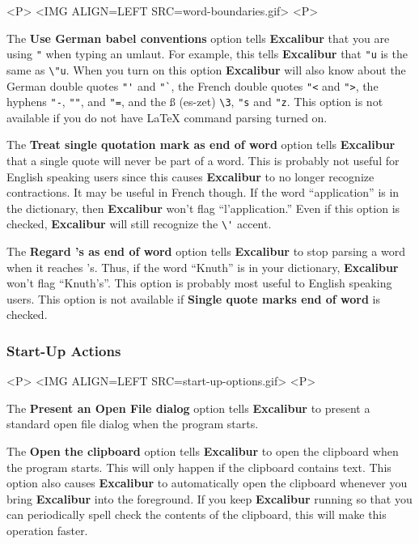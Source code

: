 \documentclass[11pt,titlepage]{article}
\newcommand{\ex}{\textbf{Excalibur}}
\begin{document}
\begin{rawhtml}
<P>
<IMG ALIGN=LEFT SRC=word-boundaries.gif>
<P>
\end{rawhtml}

The \textbf{Use German babel conventions} option tells \ex{} that you
are using \texttt{"} when typing an umlaut.  For example, this tells
\ex{} that \verb+"u+ is the same as \verb+\"u+.  When you turn on this
option \ex{} will also know about the German double quotes \verb+"'+
and \verb+"`+, the French double quotes \verb+"<+ and \verb+">+, the
hyphens \verb+"-+, \verb+""+, and \verb+"=+, and the \ss{} (es-zet)
\verb+\3+, \verb+"s+ and \verb+"z+.  This option is not available if
you do not have \LaTeX{} command parsing turned on.

The \textbf{Treat single quotation mark as end of word} option tells
\ex{} that a single quote will never be part of a word. This is
probably not useful for English speaking users since this causes \ex{}
to no longer recognize contractions. It may be useful in French
though. If the word ``application'' is in the dictionary, then \ex{}
won't flag ``l'application.'' Even if this option is checked, \ex{}
will still recognize the \verb+\'+ accent.

The \textbf{Regard 's as end of word} option tells \ex{} to stop
parsing a word when it reaches 's.  Thus, if the word ``Knuth'' is in
your dictionary, \ex{} won't flag ``Knuth's''.  This option is
probably most useful to English speaking users.  This option is not
available if \textbf{Single quote marks end of word} is checked.

\subsubsection{Start-Up Actions}
\label{sec:start-up-actions}

\begin{rawhtml}
<P>
<IMG ALIGN=LEFT SRC=start-up-options.gif>
<P>
\end{rawhtml}

The \textbf{Present an Open File dialog} option tells \ex{} to present
a standard open file dialog when the program starts.

The \textbf{Open the clipboard} option tells \ex{} to open the
clipboard when the program starts.  This will only happen if the
clipboard contains text.  This option also causes \ex{} to
automatically open the clipboard whenever you bring \ex{} into the
foreground.  If you keep \ex{} running so that you can periodically
spell check the contents of the clipboard, this will make this
operation faster.
\end{document}
